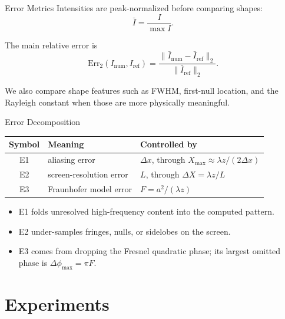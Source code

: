\documentclass[aspectratio=169,11pt]{beamer}
\begin{document}
\begin{frame}{Error Metrics}
    Intensities are peak-normalized before comparing shapes:
    \[
        \bar{I}=\frac{I}{\max I}.
    \]

    \vspace{0.15cm}
    The main relative error is
    \[
        \mathrm{Err}_2(I_{\mathrm{num}},I_{\mathrm{ref}})
        =
        \frac{\|\bar{I}_{\mathrm{num}}-\bar{I}_{\mathrm{ref}}\|_2}
        {\|\bar{I}_{\mathrm{ref}}\|_2}.
    \]

    \vspace{0.15cm}
    We also compare shape features such as FWHM, first-null location, and the Rayleigh constant when those
    are more physically meaningful.
\end{frame}

\begin{frame}{Error Decomposition}
    \begin{center}
    \begin{tabular}{cll}
        \toprule
        Symbol & Meaning & Controlled by \\
        \midrule
        E1 & aliasing error & \(\Delta x\), through \(X_{\max}\approx\lambda z/(2\Delta x)\) \\
        E2 & screen-resolution error & \(L\), through \(\Delta X=\lambda z/L\) \\
        E3 & Fraunhofer model error & \(F=a^2/(\lambda z)\) \\
        \bottomrule
    \end{tabular}
    \end{center}

    \vspace{0.2cm}
    \begin{itemize}
        \item E1 folds unresolved high-frequency content into the computed pattern.
        \item E2 under-samples fringes, nulls, or sidelobes on the screen.
        \item E3 comes from dropping the Fresnel quadratic phase; its largest omitted phase is
              \(\Delta\phi_{\max}=\pi F\).
    \end{itemize}
\end{frame}

\section{Experiments}
\end{document}
